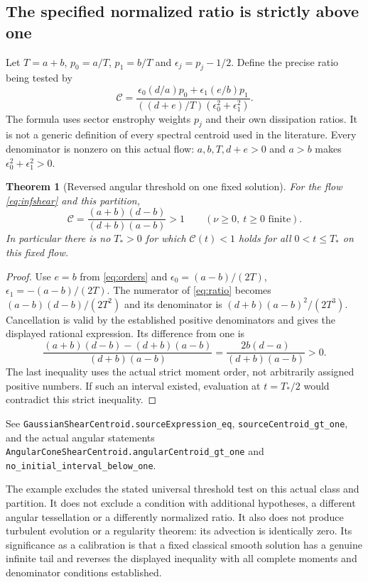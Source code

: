 \documentclass[11pt]{article}
\newtheorem{theorem}{Theorem}[section]
\newcommand{\code}[1]{{\small\nolinkurl{#1}}}
\begin{document}
\subsection{The specified normalized ratio is strictly above one}
Let $T=a+b$, $p_0=a/T$, $p_1=b/T$ and
$\epsilon_j=p_j-1/2$. Define the precise ratio being tested by
\begin{equation}\label{eq:ratio}
 \mathcal C=
 \frac{\epsilon_0(d/a)p_0+\epsilon_1(e/b)p_1}
 {((d+e)/T)(\epsilon_0^2+\epsilon_1^2)}.
\end{equation}
The formula uses sector enstrophy weights $p_j$ and their own dissipation
ratios. It is not a generic definition of every spectral centroid used in
the literature. Every denominator is nonzero on this actual flow:
$a,b,T,d+e>0$ and $a>b$ makes
$\epsilon_0^2+\epsilon_1^2>0$.

\begingroup\raggedright
\begin{theorem}[Reversed angular threshold on one fixed solution]
For the flow \eqref{eq:infshear} and this partition,
\[
 \mathcal C=
 \frac{(a+b)(d-b)}{(d+b)(a-b)}>1
 \qquad(\nu\geq0,\ t\geq0\text{ finite}).
\]
In particular there is no $T_*>0$ for which $\mathcal C(t)<1$ holds for
all $0<t\leq T_*$ on this fixed flow.
\end{theorem}
\begin{proof}
Use $e=b$ from \eqref{eq:orders} and
$\epsilon_0=(a-b)/(2T)$, $\epsilon_1=-(a-b)/(2T)$.
The numerator of \eqref{eq:ratio} becomes
$(a-b)(d-b)/(2T^2)$ and its denominator is
$(d+b)(a-b)^2/(2T^3)$. Cancellation is valid by the established positive
denominators and gives the displayed rational expression. Its difference
from one is
\[
 \frac{(a+b)(d-b)-(d+b)(a-b)}{(d+b)(a-b)}
 =\frac{2b(d-a)}{(d+b)(a-b)}>0.
\]
The last inequality uses the actual strict moment order, not arbitrarily
assigned positive numbers. If such an interval existed, evaluation at
$t=T_*/2$ would contradict this strict inequality.
\end{proof}
See \code{GaussianShearCentroid.sourceExpression_eq},
\code{sourceCentroid_gt_one}, and the actual angular statements
\code{AngularConeShearCentroid.angularCentroid_gt_one} and
\code{no_initial_interval_below_one}.
\par\endgroup

The example excludes the stated universal threshold test on this actual
class and partition. It does not exclude a condition with additional
hypotheses, a different angular tessellation or a differently normalized
ratio. It also does not produce turbulent evolution or a regularity
theorem: its advection is identically zero. Its significance as a
calibration is that a fixed classical smooth solution has a genuine
infinite tail and reverses the displayed inequality with all complete
moments and denominator conditions established.
\end{document}
